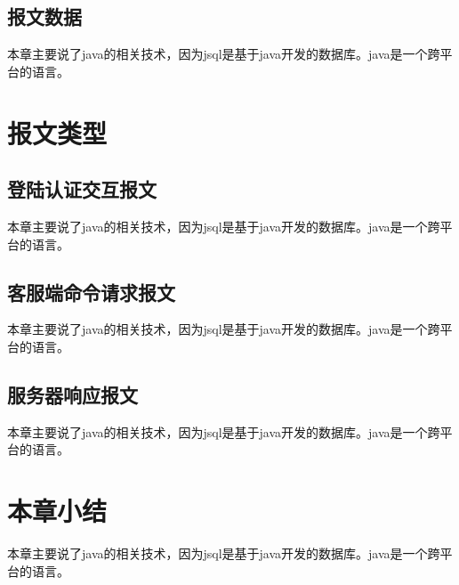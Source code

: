\subsection{报文数据}
本章主要说了java的相关技术，因为jsql是基于java开发的数据库。java是一个跨平台的语言。

\section{报文类型}
\subsection{登陆认证交互报文}
本章主要说了java的相关技术，因为jsql是基于java开发的数据库。java是一个跨平台的语言。
\subsection{客服端命令请求报文}
本章主要说了java的相关技术，因为jsql是基于java开发的数据库。java是一个跨平台的语言。
\subsection{服务器响应报文}
本章主要说了java的相关技术，因为jsql是基于java开发的数据库。java是一个跨平台的语言。

\section{本章小结}
本章主要说了java的相关技术，因为jsql是基于java开发的数据库。java是一个跨平台的语言。

